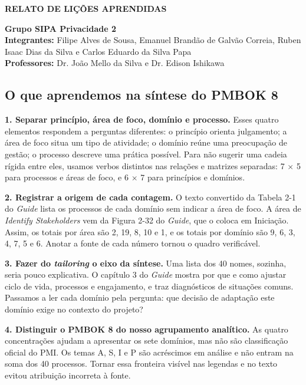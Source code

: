 \documentclass[12pt,a4paper,article,oneside,english,brazil]{abntex2}
\begin{document}
\SingleSpacing
\small
\linespread{1.04}\selectfont
\setlength{\parskip}{5pt plus 1pt}
\thispagestyle{plain}

\begin{center}\textbf{RELATO DE LIÇÕES APRENDIDAS}\end{center}

\noindent \textbf{Grupo SIPA Privacidade 2}\\ \textbf{Integrantes:} Filipe Alves de Sousa, Emanuel Brandão de Galvão Correia, Ruben Isaac Dias da Silva e Carlos Eduardo da Silva Papa\\ \textbf{Professores:} Dr. João Mello da Silva e Dr. Edison Ishikawa

\subsection*{O que aprendemos na síntese do PMBOK 8}

\textbf{1. Separar princípio, área de foco, domínio e processo.} Esses quatro elementos respondem a perguntas diferentes: o princípio orienta julgamento; a área de foco situa um tipo de atividade; o domínio reúne uma preocupação de gestão; o processo descreve uma prática possível. Para não sugerir uma cadeia rígida entre eles, usamos verbos distintos nas relações e matrizes separadas: 7 \ensuremath{\times} 5 para processos e áreas de foco, e 6 \ensuremath{\times} 7 para princípios e domínios.

\textbf{2. Registrar a origem de cada contagem.} O texto convertido da Tabela 2-1 do \textit{Guide} lista os processos de cada domínio sem indicar a área de foco. A área de \textit{Identify Stakeholders} vem da Figura 2-32 do \textit{Guide}, que o coloca em Iniciação. Assim, os totais por área são 2, 19, 8, 10 e 1, e os totais por domínio são 9, 6, 3, 4, 7, 5 e 6. Anotar a fonte de cada número tornou o quadro verificável.

\textbf{3. Fazer do \textit{tailoring} o eixo da síntese.} Uma lista dos 40 nomes, sozinha, seria pouco explicativa. O capítulo 3 do \textit{Guide} mostra por que e como ajustar ciclo de vida, processos e engajamento, e traz diagnósticos de situações comuns. Passamos a ler cada domínio pela pergunta: que decisão de adaptação este domínio exige no contexto do projeto?

\textbf{4. Distinguir o PMBOK 8 do nosso agrupamento analítico.} As quatro concentrações ajudam a apresentar os sete domínios, mas não são classificação oficial do PMI. Os temas A, S, I e P são acréscimos em análise e não entram na soma dos 40 processos. Tornar essa fronteira visível nas legendas e no texto evitou atribuição incorreta à fonte.
\end{document}
